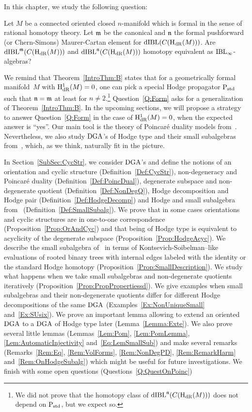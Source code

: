 \documentclass[\MainFolder/Text.tex]{subfiles}
\begin{document}
In this chapter, we study the following question:
\begin{Question}\label{Q:Form}
Let $M$ be a connected oriented closed $n$-manifold which is formal in the sense of rational homotopy theory.
Let $\mathfrak{m}$ be the canonical and $\mathfrak{n}$ the formal pushforward (or Chern-Simons) Maurer-Cartan element for $\mathrm{dIBL}(C(\mathrm{H}_{\mathrm{dR}}(M)))$.
Are $\mathrm{dIBL}^{\mathfrak{m}}(C(\mathrm{H}_{\mathrm{dR}}(M)))$ and $\mathrm{dIBL}^{\mathfrak{n}}(C(\mathrm{H}_{\mathrm{dR}}(M)))$ homotopy equivalent as $\mathrm{IBL}_\infty$-algebras?
\end{Question}
We remind that Theorem~\ref{IntroThm:B} states that for a geometrically formal manifold~$M$ with $\mathrm{H}_{\mathrm{dR}}^1(M) = 0$, one can pick a special Hodge propagator $\mathrm{P}_{\mathrm{std}}$ such that $\mathfrak{n} = \mathfrak{m}$ at least for $n\neq 2$.\footnote{We did not prove that the homotopy class of $\mathrm{dIBL}^{\mathfrak{n}}(C(\mathrm{H}_{\mathrm{dR}}(M)))$ does not depend on $\mathrm{P}_{\mathrm{std}}$, but we expect so.} Question~\ref{Q:Form} asks for a generalization of Theorem~\ref{IntroThm:B}.
In the upcoming sections, we will propose a strategy to answer Question~\ref{Q:Form} in the case of $\mathrm{H}_{\mathrm{dR}}^1(M) = 0$, when the expected answer is ``yes''.
Our main tool is the theory of Poincar\'e duality models from~\cite{Lambrechts2007}.
Nevertheless, we also study $\mathrm{DGA}$'s of Hodge type and their small subalgebras from~\cite{Van2019}, which, as we think, naturally fit in the picture.

In Section~\ref{SubSec:CycStr}, we consider $\mathrm{DGA}$'s and define the notions of an orientation and cyclic structure (Definition~\ref{Def:CycStr}), non-degeneracy and Poincar\'e duality (Definition~\ref{Def:PoincDual}), degenerate subspace and non-degenerate quotient (Definition~\ref{Def:NonDegQ}), Hodge decomposition and Hodge pair (Definition~\ref{Def:HodgeDecomp}) and Hodge and small subalgebra from~\cite{Van2019} (Definition~\ref{Def:SmallSubalg}).
We prove that in some cases orientations and cyclic structures are in one-to-one correspondence (Proposition~\ref{Prop:OrAndCyc}) and that being of Hodge type is equivalent to acyclicity of the degenerate subspace (Proposition~\ref{Prop:HodgeAcyc}).
We describe the small subalgebra of~\cite{Van2019} in terms of Kontsevich-Soibelman--like evaluations of rooted binary trees with internal edges labeled with the identity or the standard Hodge homotopy (Proposition~\ref{Prop:SmallDescription}).
We study what happens when we take small subalgebras and non-degenerate quotients iteratively (Proposition~\ref{Prop:PropPropertiessd}).
We give examples when small subalgebras and their non-degenerate quotients differ for different Hodge decompositions of the same $\mathrm{DGA}$ (Examples~\ref{Ex:NonUniqueSmall} and~\ref{Ex:SUsix}).
We prove an important lemma allowing to extend an oriented $\mathrm{DGA}$ to a $\mathrm{DGA}$ of Hodge type later (Lemma~\ref{Lemma:Exte}).
We also prove several little lemmas (Lemmas~\ref{Lem:Pom}, \ref{Lem:PomLemma}, \ref{Lem:AutomaticInjectivity} and~\ref{Eq:LemSmallSub}) and make several remarks (Remarks~\ref{Rem:Eq}, \ref{Rem:VolForms}, \ref{Rem:NonDegPD}, \ref{Rem:RemarkHarm} and~\ref{Rem:OnHodgeSubalg}) which might be useful for future investigations.
We finish with some open questions (Questions~\ref{Q:QuestOnPoinc})
\end{document}
